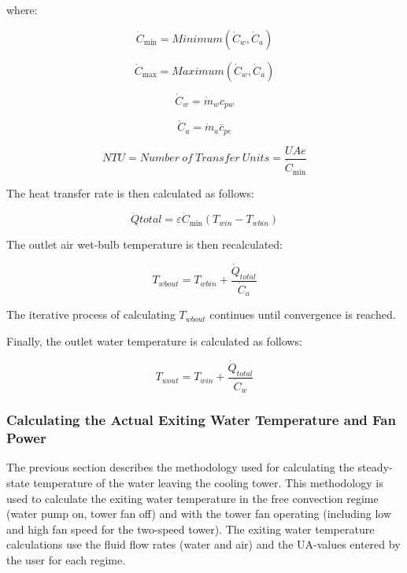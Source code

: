 where:

\begin{equation}
{\dot C_{\min }} = Minimum({\dot C_w},{\dot C_a})
\end{equation}

\begin{equation}
{\dot C_{\max }} = Maximum({\dot C_w},{\dot C_a})
\end{equation}

\begin{equation}
{\dot C_w} = {\dot m_w}c_{pw}
\end{equation}

\begin{equation}
{\dot C_a} = {\dot m_a}\bar c_{pe}
\end{equation}

\begin{equation}
NTU = Number~of~Transfer~Units = \frac{{UAe}}{{{{\dot C}_{\min }}}}
\end{equation}

The heat transfer rate is then calculated as follows:

\begin{equation}
\dot Qtotal = \varepsilon {\dot C_{\min }}\left( {T_{win} - T_{wbin}} \right)
\end{equation}

The outlet air wet-bulb temperature is then recalculated:

\begin{equation}
{T_{wbout}} = {T_{wbin}} + \frac{{{{\dot Q}_{total}}}}{{{{\dot C}_a}}}
\end{equation}

The iterative process of calculating \({T_{wbout}}\) continues until convergence is reached.

Finally, the outlet water temperature is calculated as follows:

\begin{equation}
{T_{wout}} = {T_{win}} + \frac{{{{\dot Q}_{total}}}}{{{{\dot C}_w}}}
\end{equation}

\subsubsection{Calculating the Actual Exiting Water Temperature and Fan Power}\label{calculating-the-actual-exiting-water-temperature-and-fan-power}

The previous section describes the methodology used for calculating the steady-state temperature of the water leaving the cooling tower. This methodology is used to calculate the exiting water temperature in the free convection regime (water pump on, tower fan off) and with the tower fan operating (including low and high fan speed for the two-speed tower). The exiting water temperature calculations use the fluid flow rates (water and air) and the UA-values entered by the user for each regime.

